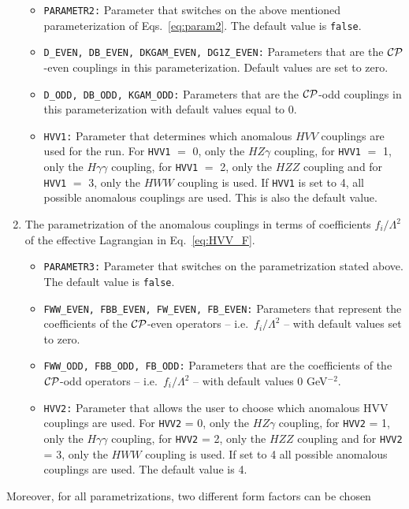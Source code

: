 \documentclass[english,12pt]{article}
\begin{document}
\begin{enumerate}
\begin{itemize}
\item {\tt PARAMETR2:} Parameter that switches on the above mentioned parameterization of Eqs.~\eqref{eq:param2}.
 The default  value is  {\tt false}.
\item {\tt D\_EVEN, DB\_EVEN, DKGAM\_EVEN, DG1Z\_EVEN:} Parameters that are 
  the $\cal{CP}$-even couplings in this parameterization.  Default values are set to zero.
\item {\tt D\_ODD, DB\_ODD, KGAM\_ODD:} Parameters that are  
the $\cal{CP}$-odd couplings in this parameterization with default values
equal to 0.
\item  {\tt HVV1:} Parameter that determines which anomalous $HVV$
  couplings are used for the run. For {\tt HVV1} $=$ 0, only the $HZ\gamma$ coupling,
  for {\tt HVV1} $=$ 1, only the $H\gamma\gamma$ coupling, for {\tt HVV1}
  $=$ 2, only the $HZZ$ coupling and for {\tt HVV1} $=$ 3, only the
  $HWW$ coupling is used. If {\tt HVV1} is set to 4, all possible
  anomalous couplings are used. This is also the default value.
\end{itemize}
%
\item  The parametrization of the anomalous couplings in terms of coefficients 
$f_i/\Lambda^2$ of the effective Lagrangian in Eq.~\eqref{eq:HVV_F}.
\begin{itemize}
\item {\tt PARAMETR3:} Parameter that switches on the parametrization stated above.
  The default value is {\tt false}.
\item {\tt FWW\_EVEN, FBB\_EVEN, FW\_EVEN, FB\_EVEN:} Parameters that represent
the coefficients of the $\cal{CP}$-even operators -- i.e.\ $f_{i}/\Lambda^{2}$
-- with default values set to zero.
\item {\tt FWW\_ODD, FBB\_ODD, FB\_ODD:} Parameters that are the coefficients of
the $\cal{CP}$-odd operators -- i.e.\ $f_{i}/\Lambda^{2}$ -- with default values
0 GeV$^{-2}$.
\item {\tt HVV2:} Parameter that allows the user to choose which anomalous HVV
  couplings are used. For {\tt HVV2} = 0, only the $HZ\gamma$ coupling,
  for {\tt HVV2} = 1, only the $H\gamma\gamma$ coupling, for {\tt HVV2}
  = 2, only the $HZZ$ coupling and for {\tt HVV2} = 3, only the
  $HWW$ coupling is used. If set to 4 all possible
  anomalous couplings are used. The default value is 4.
\end{itemize}
\end{enumerate}
Moreover, for all parametrizations, two different form factors can be chosen
\end{document}
